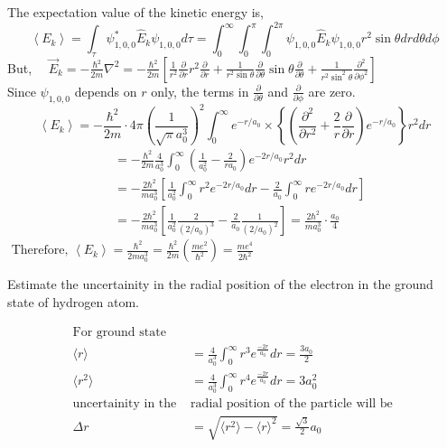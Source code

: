 \begin{answer}
	The expectation value of the kinetic energy is,
	$$
	\left\langle E_{k}\right\rangle=\int_{\tau} \psi_{1,0,0}^{*} \hat{E}_{k} \psi_{1,0,0} d \tau=\int_{0}^{\infty} \int_{0}^{\pi} \int_{0}^{2 \pi} \psi_{1,0,0} \hat{E}_{k} \psi_{1,0,0} r^{2} \sin \theta d r d \theta d \phi
	$$
	But, $\quad \vec{E}_{k}=-\frac{\hbar^{2}}{2 m} \nabla^{2}=-\frac{\hbar^{2}}{2 m}\left[\frac{1}{r^{2}} \frac{\partial}{\partial r} r^{2} \frac{\partial}{\partial r}+\frac{1}{r^{2} \sin \theta} \frac{\partial}{\partial \theta} \sin \theta \frac{\partial}{\partial \theta}+\frac{1}{r^{2} \sin ^{2} \theta} \frac{\partial^{2}}{\partial \phi^{2}}\right]$\\
	Since $\psi_{1,0,0}$ depends on $r$ only, the terms in $\frac{\partial}{\partial \theta}$ and $\frac{\partial}{\partial \phi}$ are zero.\\
	$$\left\langle E_{k}\right\rangle=-\frac{\hbar^{2}}{2 m} \cdot 4 \pi\left(\frac{1}{\sqrt{\pi} a_{0}^{3}}\right)^{2} \int_{0}^{\infty} e^{-r / a_{0}} \times\left\{\left(\frac{\partial^{2}}{\partial r^{2}}+\frac{2}{r} \frac{\partial}{\partial r}\right) e^{-r / a_{0}}\right\} r^{2} d r$$
	$$\begin{aligned}
		&=-\frac{\hbar^{2}}{2 m} \frac{4}{a_{0}^{3}} \int_{0}^{\infty}\left(\frac{1}{a_{0}^{2}}-\frac{2}{r a_{0}}\right) e^{-2 r / a_{0}} r^{2} d r \\
		&=-\frac{2 \hbar^{2}}{m a_{0}^{3}}\left[\frac{1}{a_{0}^{2}} \int_{0}^{\infty} r^{2} e^{-2 r / a_{0}} d r-\frac{2}{a_{0}} \int_{0}^{\infty} r e^{-2 r / a_{0}} d r\right] \\
		&=-\frac{2 \hbar^{2}}{m a_{0}^{3}}\left[\frac{1}{a_{0}^{2}} \frac{2}{\left(2 / a_{0}\right)^{3}}-\frac{2}{a_{0}} \frac{1}{\left(2 / a_{0}\right)^{2}}\right]=\frac{2 \hbar^{2}}{m a_{0}^{3}} \cdot \frac{a_{0}}{4}
	\end{aligned}$$
	$\text { Therefore, }\left\langle E_{k}\right\rangle=\frac{\hbar^{2}}{2 m a_{0}^{3}}=\frac{\hbar^{2}}{2 m}\left(\frac{m e^{2}}{\hbar^{2}}\right)=\frac{m e^{4}}{2 \hbar^{2}}$
\end{answer}
\begin{exercise}
 Estimate the uncertainity in the radial position of the electron in the ground state of hydrogen atom.
\end{exercise}
\begin{answer}
	\begin{align*}
	\text{For ground state}\\
	\langle r \rangle &=\frac{4}{a_0^3}	\int_{0}^{\infty} r^3 e^{\frac{-2r}{a_0}}dr=\frac{3a_0}{2}\\
	\langle r^2 \rangle &=\frac{4}{a_0^3}	\int_{0}^{\infty} r^4 e^{\frac{-2r}{a_0}}dr=3a_0^2\\
	\text{uncertainity in the }&\text{radial position of the particle will be }\\
	\Delta r&=\sqrt{\langle r^2 \rangle-\langle r \rangle^2}=\frac{\sqrt{3}}{2}a_0
	\end{align*}
\end{answer}
